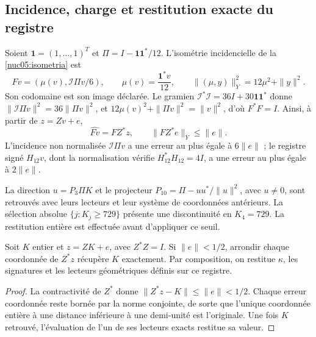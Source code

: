 \subsection{Incidence, charge et restitution exacte du registre}
\label{lib04:incidencia}

Soient \(\mathbf1=(1,\ldots,1)^T\) et
\(\Pi=I-\mathbf1\mathbf1^*/12\). L’isométrie incidencielle de
la \cref{nuc05:isometria} est
\begin{equation}
 Fv=(\mu(v),\mathcal I\Pi v/6),\qquad
 \mu(v)=\frac{\mathbf1^*v}{12},\qquad
 \|(\mu,y)\|_Y^2=12\mu^2+\|y\|^2.
 \label{lib04:f-incidencia}
\end{equation}
Son codomaine est son image déclarée. Le gramien
\(\mathcal I^*\mathcal I=36I+30\mathbf1\mathbf1^*\) donne
\(\|\mathcal I\Pi v\|^2=36\|\Pi v\|^2\), et
\(12\mu(v)^2+\|\Pi v\|^2=\|v\|^2\), d’où \(F^*F=I\).
Ainsi, à partir de \(z=Zv+e\),
\begin{equation}
 \widehat{Fv}=FZ^*z,\qquad \|FZ^*e\|_Y\leq\|e\|.
 \label{lib04:error-incidencia}
\end{equation}
L’incidence non normalisée \(\mathcal I\Pi v\) a une erreur au
plus égale à \(6\|e\|\) ; le registre signé \(H_{12}v\), dont la
normalisation vérifie \(H_{12}^*H_{12}=4I\), a une erreur au plus égale à
\(2\|e\|\).

La direction \(u=P_3\Pi K\) et le projecteur
\(P_{10}=\Pi-uu^*/\|u\|^2\), avec \(u\neq0\), sont retrouvés
avec leurs lecteurs et leur système de coordonnées antérieurs. La sélection absolue
\(\{j:K_j\geq729\}\) présente une discontinuité en \(K_4=729\).
La restitution entière est effectuée avant d’appliquer ce seuil.

\begin{proposition}
\label{lib04:prop-redondeo}
Soit \(K\) entier et \(z=ZK+e\), avec \(Z^*Z=I\). Si \(\|e\|<1/2\), arrondir chaque coordonnée de \(Z^*z\) récupère \(K\) exactement. Par composition, on restitue \(\kappa\), les signatures et les lecteurs géométriques définis sur ce registre.
\end{proposition}

\begin{proof}
La contractivité de \(Z^*\) donne
\(\|Z^*z-K\|\leq\|e\|<1/2\). Chaque erreur coordonnée reste
bornée par la norme conjointe, de sorte que l’unique coordonnée entière
à une distance inférieure à une demi-unité est l’originale. Une fois
\(K\) retrouvé, l’évaluation de l’un de ses lecteurs exacts
restitue sa valeur.
\end{proof}


